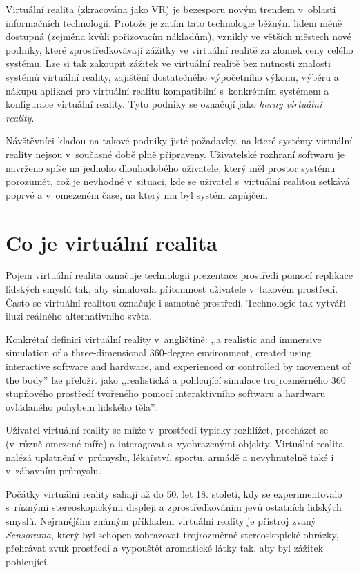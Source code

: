 Virtuální realita (zkracována jako VR) je bezesporu novým trendem
v~oblasti informačních technologií. Protože je zatím tato technologie běžným
lidem méně dostupná (zejména kvůli pořizovacím nákladům), vznikly ve větších městech nové podniky, které
zprostředkovávají zážitky ve virtuální realitě za zlomek ceny celého
systému. Lze si tak zakoupit zážitek ve virtuální realitě bez nutnosti znalosti systémů virtuální reality, zajištění
dostatečného výpočetního výkonu, výběru a nákupu aplikací pro virtuální
realitu kompatibilní s~konkrétním systémem a konfigurace virtuální reality. Tyto podniky se označují jako \emph{herny virtuální reality}. \autocite{herny}

Návštěvníci kladou na takové podniky jisté požadavky, na které
systémy virtuální reality nejsou v~současné době plně připraveny.
Uživatelské rozhraní softwaru je navrženo spíše na jednoho dlouhodobého
uživatele, který měl prostor systému porozumět, což je nevhodné
v~situaci, kde se uživatel s~virtuální realitou setkává poprvé a
v~omezeném čase, na který mu byl systém zapůjčen.

\section{Co je virtuální
realita}\label{co-je-virtuuxe1lnuxed-realita}

Pojem virtuální realita označuje technologii prezentace prostředí pomocí
replikace lidských smyslů tak, aby simulovala přítomnost uživatele
v~takovém prostředí. Často se virtuální realitou označuje i samotné
prostředí. Technologie tak vytváří iluzi reálného alternativního světa. \autocite{ovr}

Konkrétní definici virtuální reality v~angličtině: ,,a realistic and
immersive simulation of a three-dimensional 360-degree environment,
created using interactive software and hardware, and experienced or
controlled by movement of the body'' \autocite{vrdef} lze přeložit jako ,,realistická a
pohlcující simulace trojrozměrného 360 stupňového prostředí tvořeného
pomocí interaktivního softwaru a hardwaru ovládaného pohybem lidského
těla''.

Uživatel virtuální reality se může v~prostředí typicky rozhlížet,
procházet se (v~různě omezené míře) a interagovat s~vyobrazenými
objekty. Virtuální realita nalézá uplatnění v~průmyslu, lékařství,
sportu, armádě a nevyhnutelně také i v~zábavním průmyslu. \autocite{vrusage}

Počátky virtuální reality sahají až do 50. let 18. století, kdy se
experimentovalo s~různými stereoskopickými displeji a zprostředkováním
jevů ostatních lidských smyslů. Nejranějším známým příkladem virtuální
reality je přístroj zvaný \emph{Sensorama}, který byl schopen zobrazovat
trojrozměrné stereoskopické obrázky, přehrávat zvuk prostředí a
vypouštět aromatické látky tak, aby byl zážitek pohlcující. \autocite{oldvr}

